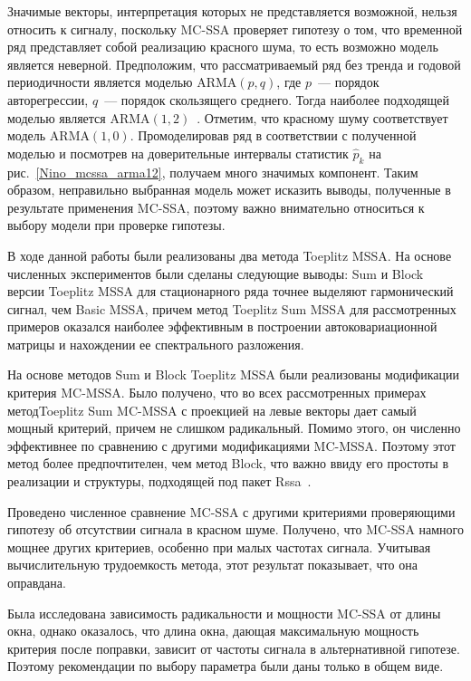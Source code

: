 \documentclass[specialist,
substylefile = spbu.rtx,
               subf,href,colorlinks=true,12pt]{disser}
\theoremstyle{definition}
\begin{document}
Значимые векторы, интерпретация которых не представляется возможной, нельзя относить к сигналу, поскольку MC-SSA проверяет гипотезу о том, что временной ряд представляет собой реализацию красного шума, то есть возможно модель является неверной. Предположим, что рассматриваемый ряд без тренда и годовой периодичности является моделью ARMA$(p, q)$, где $p$~--- порядок авторегрессии, $q$~--- порядок скользящего среднего. Тогда наиболее подходящей моделью является ARMA$(1, 2)$~\cite{Hyndman2008}. Отметим, что красному шуму соответствует модель ARMA$(1, 0)$. Промоделировав ряд в соответствии с полученной моделью и посмотрев на доверительные интервалы статистик $\hat p_k$ на рис.~\ref{Nino_mcssa_arma12}, получаем много значимых компонент. Таким образом, неправильно выбранная модель может исказить выводы, полученные в результате применения MC-SSA, поэтому важно внимательно относиться к выбору модели при проверке гипотезы.

\conclusion
В ходе данной работы были реализованы два метода Toeplitz MSSA. На основе численных экспериментов были сделаны следующие выводы: Sum и Block версии Toeplitz MSSA для стационарного ряда точнее выделяют гармонический сигнал, чем Basic MSSA, причем метод Toeplitz Sum MSSA для рассмотренных примеров оказался наиболее эффективным в построении автоковариационной матрицы и нахождении ее спектрального разложения.

На основе методов Sum и Block Toeplitz MSSA были реализованы модификации критерия MC-MSSA. Было получено, что во всех рассмотренных примерах метод\linebreak Toeplitz Sum MC-MSSA с проекцией на левые векторы дает самый мощный критерий, причем не слишком радикальный. Помимо этого, он численно эффективнее по сравнению с другими модификациями MC-MSSA. Поэтому этот метод более предпочтителен, чем метод Block, что важно ввиду его простоты в реализации и структуры, подходящей под пакет \textsf{Rssa}~\cite{Rssa}.

Проведено численное сравнение MC-SSA с другими критериями проверяющими гипотезу об отсутствии сигнала в красном шуме. Получено, что MC-SSA намного мощнее других критериев, особенно при малых частотах сигнала. Учитывая вычислительную трудоемкость метода, этот результат показывает, что она оправдана.

Была исследована зависимость радикальности и мощности MC-SSA от длины окна, однако оказалось, что длина окна, дающая максимальную мощность критерия после поправки, зависит от частоты сигнала в альтернативной гипотезе. Поэтому рекомендации по выбору параметра были даны только в общем виде.
\end{document}
